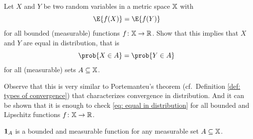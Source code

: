 
\begin{exercise}[subtitle={How to check ``Equal in distribution'' \Coffeecup}]
    \label{ex: equal in distribution}
    Let \(X\) and \(Y\) be two random variables in a metric space \(\mathbb{X}\) with
    \begin{equation}
        \label{eq: equal in distribution}    
        \E{f(X)} = \E{f(Y)}
    \end{equation}
    for all bounded (measurable) functions \(f\colon \mathbb{X} \to \mathbb{R}\). Show
    that this implies that \(X\) and \(Y\) are equal in distribution, that is
    \[
        \prob{X \in A} = \prob{Y \in A}
    \]
    for all (measurable) sets \(A\subseteq \mathbb{X}\).
    
\begin{remark}
    Observe that this is very similar to Portemanteu's theorem (cf.~Definition
    \ref{def: types of convergence}) that characterizes convergence in
    distribution. And it can be shown that it is enough to check \eqref{eq:
    equal in distribution} for all bounded and Lipschitz functions \(f\colon
    \mathbb{X} \to \mathbb{R}\).
\end{remark}
    \begin{solution}
        \(\ind{A}\) is a bounded and measurable function for any measurable set \(A\subseteq \mathbb{X}\).
    \end{solution}
\end{exercise}
